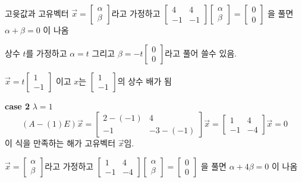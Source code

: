 \documentclass[10pt,t]{beamer}
\begin{document}
\begin{frame}{고윳값과 고유벡터}
$\vec{x} = \begin{bmatrix}
    \alpha\\
    \beta
\end{bmatrix}$라고 가정하고 $\begin{bmatrix}
    4& 4\\
    -1 & -1
\end{bmatrix}\begin{bmatrix}
    \alpha\\
    \beta
\end{bmatrix} = \begin{bmatrix}
    0\\
    0
\end{bmatrix}$ 을 풀면 $\alpha + \beta = 0$ 이 나옴

상수 $t$를 가정하고 $\alpha = t$ 그리고 $\beta = -t\begin{bmatrix}
    0\\
    0
\end{bmatrix}$라고 풀어 쓸수 있음.

$\vec{x} = t\begin{bmatrix}
    1\\
    -1
\end{bmatrix}$ 이고 $x$는 $\begin{bmatrix}
    1\\
    -1
\end{bmatrix}$의 상수 배가 됨

\pagebreak

\textbf{case 2} $\lambda = 1$
\[ (A-(1)E)\vec{x} = \begin{bmatrix}
    2-(-1)& 4\\
    -1&-3-(-1)
\end{bmatrix}\vec{x} = \begin{bmatrix}
    1 & 4\\
    -1 & -4
\end{bmatrix}\vec{x} =0\]
이 식을 만족하는 해가 고유벡터 $\vec{x}$임. 

$\vec{x} = \begin{bmatrix}
    \alpha\\
    \beta
\end{bmatrix}$라고 가정하고 $\begin{bmatrix}
    1 & 4\\
    -1 & -4
\end{bmatrix}\begin{bmatrix}
    \alpha\\
    \beta
\end{bmatrix} = \begin{bmatrix}
    0\\
    0
\end{bmatrix}$ 을 풀면 $\alpha + 4\beta = 0$ 이 나옴


\end{frame}
\end{document}
